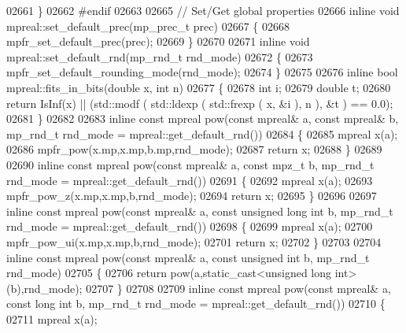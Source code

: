 \begin{DoxyCode}
{{02661 \}
02662 \textcolor{preprocessor}{#endif}
02663 
02665 \textcolor{comment}{// Set/Get global properties}
02666 \textcolor{keyword}{inline} \textcolor{keywordtype}{void} mpreal::set\_default\_prec(mp\_prec\_t prec)
02667 \{
02668     mpfr\_set\_default\_prec(prec);
02669 \}
02670 
02671 \textcolor{keyword}{inline} \textcolor{keywordtype}{void} mpreal::set\_default\_rnd(mp\_rnd\_t rnd\_mode)
02672 \{
02673     mpfr\_set\_default\_rounding\_mode(rnd\_mode);
02674 \}
02675 
02676 \textcolor{keyword}{inline} \textcolor{keywordtype}{bool} mpreal::fits\_in\_bits(\textcolor{keywordtype}{double} x, \textcolor{keywordtype}{int} n)
02677 \{
02678     \textcolor{keywordtype}{int} i;
02679     \textcolor{keywordtype}{double} t;
02680     \textcolor{keywordflow}{return} IsInf(x) || (std::modf ( std::ldexp ( std::frexp ( x, &i ), n ), &t ) == 0.0);
02681 \}
02682 
02683 \textcolor{keyword}{inline} \textcolor{keyword}{const} mpreal pow(\textcolor{keyword}{const} mpreal& a, \textcolor{keyword}{const} mpreal& b, mp\_rnd\_t rnd\_mode = mpreal::get\_default\_rnd())
02684 \{
02685     mpreal x(a);
02686     mpfr\_pow(x.mp,x.mp,b.mp,rnd\_mode);
02687     \textcolor{keywordflow}{return} x;
02688 \}
02689 
02690 \textcolor{keyword}{inline} \textcolor{keyword}{const} mpreal pow(\textcolor{keyword}{const} mpreal& a, \textcolor{keyword}{const} mpz\_t b, mp\_rnd\_t rnd\_mode = mpreal::get\_default\_rnd())
02691 \{
02692     mpreal x(a);
02693     mpfr\_pow\_z(x.mp,x.mp,b,rnd\_mode);
02694     \textcolor{keywordflow}{return} x;
02695 \}
02696 
02697 \textcolor{keyword}{inline} \textcolor{keyword}{const} mpreal pow(\textcolor{keyword}{const} mpreal& a, \textcolor{keyword}{const} \textcolor{keywordtype}{unsigned} \textcolor{keywordtype}{long} \textcolor{keywordtype}{int} b, mp\_rnd\_t rnd\_mode = 
      mpreal::get\_default\_rnd())
02698 \{
02699     mpreal x(a);
02700     mpfr\_pow\_ui(x.mp,x.mp,b,rnd\_mode);
02701     \textcolor{keywordflow}{return} x;
02702 \}
02703 
02704 \textcolor{keyword}{inline} \textcolor{keyword}{const} mpreal pow(\textcolor{keyword}{const} mpreal& a, \textcolor{keyword}{const} \textcolor{keywordtype}{unsigned} \textcolor{keywordtype}{int} b, mp\_rnd\_t rnd\_mode)
02705 \{
02706     \textcolor{keywordflow}{return} pow(a,static\_cast<unsigned long int>(b),rnd\_mode);
02707 \}
02708 
02709 \textcolor{keyword}{inline} \textcolor{keyword}{const} mpreal pow(\textcolor{keyword}{const} mpreal& a, \textcolor{keyword}{const} \textcolor{keywordtype}{long} \textcolor{keywordtype}{int} b, mp\_rnd\_t rnd\_mode = mpreal::get\_default\_rnd())
02710 \{
02711     mpreal x(a);
}}
\end{DoxyCode}
